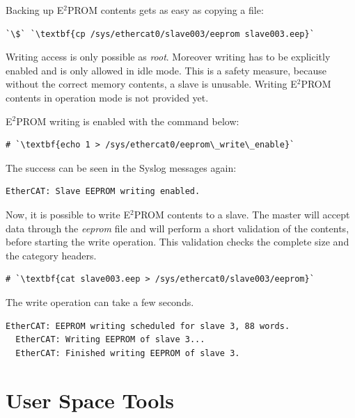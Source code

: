 \documentclass[a4paper,12pt,BCOR6mm,bibtotoc,idxtotoc]{scrbook}
\begin{document}
Backing up E$^2$PROM contents gets as easy as copying a file:

\begin{lstlisting}[gobble=2]
  `\$` `\textbf{cp /sys/ethercat0/slave003/eeprom slave003.eep}`
\end{lstlisting}

Writing access is only possible as \textit{root}. Moreover writing has
to be explicitly enabled and is only allowed in idle mode. This is a
safety measure, because without the correct memory contents, a slave
is unusable. Writing E$^2$PROM contents in operation mode is not
provided yet.

E$^2$PROM writing is enabled with the command below:

\begin{lstlisting}[gobble=2]
  # `\textbf{echo 1 > /sys/ethercat0/eeprom\_write\_enable}`
\end{lstlisting}

The success can be seen in the Syslog messages again:

\begin{lstlisting}[gobble=2]
  EtherCAT: Slave EEPROM writing enabled.
\end{lstlisting}

Now, it is possible to write E$^2$PROM contents to a slave. The master
will accept data through the \textit{eeprom} file and will perform a
short validation of the contents, before starting the write operation.
This validation checks the complete size and the category headers.

\begin{lstlisting}[gobble=2]
  # `\textbf{cat slave003.eep > /sys/ethercat0/slave003/eeprom}`
\end{lstlisting}

The write operation can take a few seconds.

\begin{lstlisting}[gobble=2]
  EtherCAT: EEPROM writing scheduled for slave 3, 88 words.
  EtherCAT: Writing EEPROM of slave 3...
  EtherCAT: Finished writing EEPROM of slave 3.
\end{lstlisting}


\section{User Space Tools}
\end{document}
